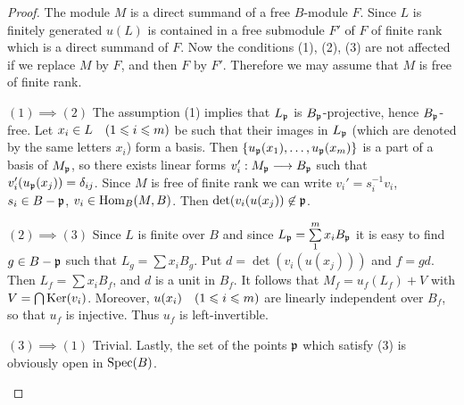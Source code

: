 \documentclass[../main]{subfiles}
\begin{document}
\begin{proof}
The module $M$ is a direct summand of a free $B$-module $F$. Since $L$ is finitely generated $u(L)$ is contained in a free submodule $F'$ of $F$ of finite rank which is a direct summand of $F$. Now the conditions (1), (2), (3) are not affected if we replace $M$ by $F$, and then $F$ by $F'$. Therefore we may assume that $M$ is free of finite rank. 
\begin{implyenumerate}
    \item[$(1) \implies (2)$] The assumption (1) implies that $L_{\mathfrak{p}}$ is $B_{\mathfrak{p}}$-projective, hence $B_{\mathfrak{p}}$-free. Let $x_i \in L\for{1 \le i \le m}$ be such that their images in $L_{\mathfrak{p}}$ (which are denoted by the same letters $x_i$) form a basis. Then $\{u_{\mathfrak{p}}(x_1), \dots, u_{\mathfrak{p}}(x_m)\}$ is a part of a basis of $M_{\mathfrak{p}}$, so there exists linear forms $v_i' : M_{\mathfrak{p}} \longrightarrow B_{\mathfrak{p}}$ such that $v_i' (u_{\mathfrak{p}}(x_j)) = \delta_{ij}$. Since $M$ is free of finite rank we can write $v_i' = s_i^{-1} v_i$, $s_i \in B - \mathfrak{p}$, $v_i \in \operatorname{Hom}_B(M, B)$. Then $\det(v_i(u(x_j)) \not \in \mathfrak{p}$. 
    \item[$(2) \implies (3)$] Since $L$ is finite over $B$ and since $L_{\mathfrak{p}} = \sum\limits_1^m x_i B_{\mathfrak{p}}$ it is easy to find $g \in B - \mathfrak{p}$ such that $L_g = \sum x_i B_g$. Put $d = \det(v_i(u(x_j)))$ and $f = gd$. Then $L_f = \sum x_i B_f$, and $d$ is a unit in $B_f$. It follows that $M_f = u_f(L_f) + V$ with $V = \bigcap \operatorname{Ker}(v_i)$. Moreover, $u(x_i)\for{1 \le i \le m}$ are linearly independent over $B_f$, so that $u_f$ is injective. Thus $u_f$ is left-invertible. 
    \item[$(3) \implies (1)$] Trivial. Lastly, the set of the points $\mathfrak{p}$ which satisfy (3) is obviously open in $\operatorname{Spec}(B)$. 
\end{implyenumerate}
\end{proof}
\end{document}
